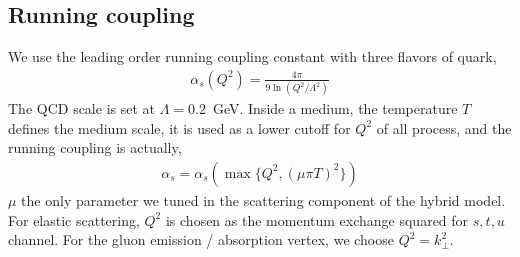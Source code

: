 \documentclass[aps, prc, reprint, amsmath, groupedaddress, nofootinbib]{revtex4-1}
\begin{document}
\begin{appendices}
\section{Running coupling}
\label{appendix:alphas}
We use the leading order running coupling constant with three flavors of quark,
\begin{eqnarray}
\alpha_s(Q^2) = \frac{4\pi}{9 \ln\left(Q^2/\Lambda^2\right) }
\end{eqnarray}
The QCD scale is set at $\Lambda = 0.2$~GeV.
Inside a medium, the temperature $T$ defines the medium scale, it is used as a lower cutoff for $Q^2$ of all process, and the running coupling is actually,
\begin{eqnarray}
\alpha_s = \alpha_s(\max\{Q^2,(\mu\pi T)^2\})
\end{eqnarray}
$\mu$ the only parameter we tuned in the scattering component of the hybrid model.
For elastic scattering, $Q^2$ is chosen as the momentum exchange squared for $s,t,u$ channel.
For the gluon emission / absorption vertex, we choose $Q^2 = k_\perp^2$.

\end{appendices}
\end{document}
